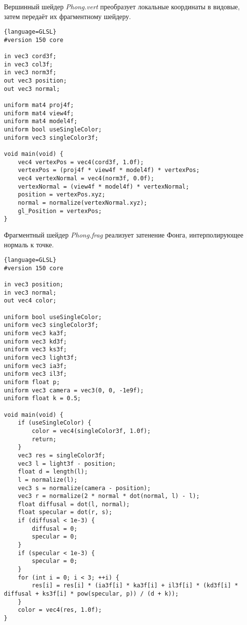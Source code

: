Вершинный шейдер \textit{Phong.vert} преобразует локальные координаты в видовые, затем передаёт их фрагментному шейдеру.

\begin{lstlisting}{language=GLSL}
#version 150 core

in vec3 cord3f;
in vec3 col3f;
in vec3 norm3f;
out vec3 position;
out vec3 normal;

uniform mat4 proj4f;
uniform mat4 view4f;
uniform mat4 model4f;
uniform bool useSingleColor;
uniform vec3 singleColor3f;

void main(void) {
    vec4 vertexPos = vec4(cord3f, 1.0f);
    vertexPos = (proj4f * view4f * model4f) * vertexPos;
    vec4 vertexNormal = vec4(norm3f, 0.0f);
    vertexNormal = (view4f * model4f) * vertexNormal;
    position = vertexPos.xyz;
    normal = normalize(vertexNormal.xyz);
    gl_Position = vertexPos;
}
\end{lstlisting}
\pagebreak

Фрагментный шейдер \textit{Phong.frag} реализует затенение Фонга, интерполирующее нормаль к точке.

\begin{lstlisting}{language=GLSL}
#version 150 core

in vec3 position;
in vec3 normal;
out vec4 color;

uniform bool useSingleColor;
uniform vec3 singleColor3f;
uniform vec3 ka3f;
uniform vec3 kd3f;
uniform vec3 ks3f;
uniform vec3 light3f;
uniform vec3 ia3f;
uniform vec3 il3f;
uniform float p;
uniform vec3 camera = vec3(0, 0, -1e9f);
uniform float k = 0.5;

void main(void) {
    if (useSingleColor) {
        color = vec4(singleColor3f, 1.0f);
        return;
    }
    vec3 res = singleColor3f;
    vec3 l = light3f - position;
    float d = length(l);
    l = normalize(l);
    vec3 s = normalize(camera - position);
    vec3 r = normalize(2 * normal * dot(normal, l) - l);
    float diffusal = dot(l, normal);
    float specular = dot(r, s);
    if (diffusal < 1e-3) {
        diffusal = 0;
        specular = 0;
    }
    if (specular < 1e-3) {
        specular = 0;
    }
    for (int i = 0; i < 3; ++i) {
        res[i] = res[i] * (ia3f[i] * ka3f[i] + il3f[i] * (kd3f[i] * diffusal + ks3f[i] * pow(specular, p)) / (d + k));
    }
    color = vec4(res, 1.0f);
}
\end{lstlisting}
\pagebreak

